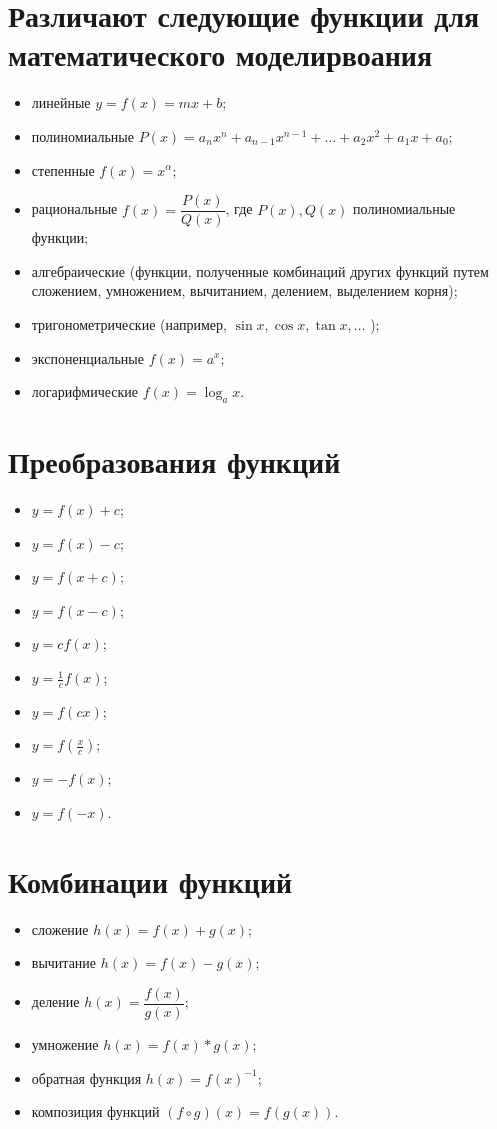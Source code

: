 \documentclass[a4paper,14pt]{report}
\begin{document}
\section*{Различают следующие функции для математического моделирвоания}
\begin{itemize}
	\item линейные $y = f(x) = mx + b$;
	\item полиномиальные $P(x) = a_n x^n + a_{n-1} x^{n-1} + \dots + a_2 x^2 + a_1 x + a_0$;
	\item степенные $f(x) = x^{\alpha}$;
	\item рациональные $f(x) = \dfrac{P(x)}{Q(x)}$, где $P(x),Q(x)$ полиномиальные функции;
	\item алгебраические (функции, полученные комбинаций других функций путем сложением, умножением, вычитанием, делением, выделением корня);
	\item тригонометрические (например, $\sin x , \cos x, \tan x, \dots$ );
	\item экспоненциальные $f(x) = a^x$;
	\item логарифмические $f(x) = \log_a x$.
\end{itemize}


\section*{ \colorbox{light-blue}{Преобразования функций}}
\begin{itemize}
	\item $y = f(x) + c$;
	\item $y = f(x) - c$;
	\item $y = f(x + c)$;
	\item $y = f(x - c)$;

	\item $y = c f(x)$;
	\item $y = \frac{1}{c} f(x)$;
	\item $y = f(cx)$;
	\item $y = f(\frac{x}{c})$;
	\item $y = -f(x)$;
	\item $y = f(-x)$.
\end{itemize}

\section*{ \colorbox{light-blue}{Комбинации функций}}
\begin{itemize}
	\item сложение $h(x) = f(x) + g(x)$;
	\item вычитание $h(x) = f(x)- g(x)$;
	\item деление $h(x) = \dfrac{f(x)}{g(x)}$;
	\item умножение $h(x) = f(x) * g(x)$;
	\item обратная функция $h(x) = f(x)^{-1}$;
	\item композиция функций $(f \circ g)(x) = f(g(x))$.
\end{itemize}
\end{document}

